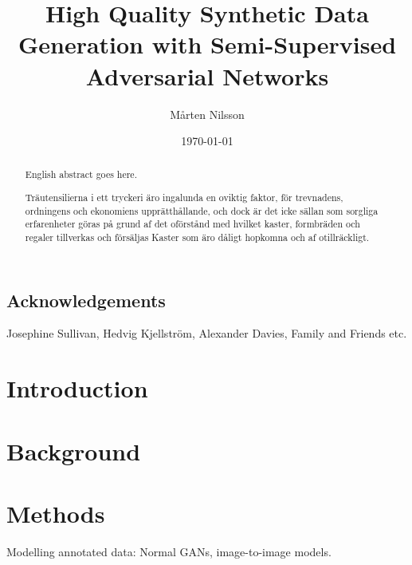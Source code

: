 \documentclass{kththesis}
\title{High Quality Synthetic Data Generation with Semi-Supervised Adversarial Networks}
\author{Mårten Nilsson}
\date{\today}
\begin{document}
\frontmatter

\titlepage

\begin{abstract}
  English abstract goes here.

  \blindtext
\end{abstract}


\begin{otherlanguage}{swedish}
  \begin{abstract}
    Träutensilierna i ett tryckeri äro ingalunda en oviktig faktor,
    för trevnadens, ordningens och ekonomiens upprätthållande, och
    dock är det icke sällan som sorgliga erfarenheter göras på grund
    af det oförstånd med hvilket kaster, formbräden och regaler
    tillverkas och försäljas Kaster som äro dåligt hopkomna och af
    otillräckligt.
  \end{abstract}
\end{otherlanguage}

\section*{Acknowledgements}
Josephine Sullivan, Hedvig Kjellström, Alexander Davies, Family and Friends etc. 

\tableofcontents


\mainmatter


\chapter{Introduction}




\chapter{Background}


\chapter{Methods}
Modelling annotated data: Normal GANs, image-to-image models.
\end{document}
